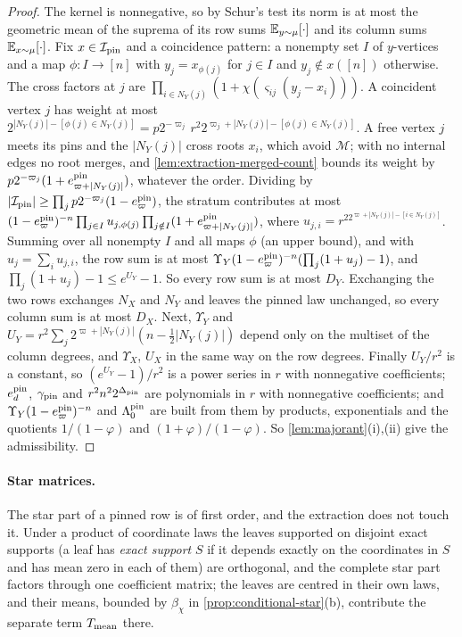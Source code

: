 \begin{proof}
The kernel is nonnegative, so by Schur's test its norm is at most the geometric mean
of the suprema of its row sums $\mathbb E_{y\sim\mu}[\cdot]$ and its column sums
$\mathbb E_{x\sim\mu}[\cdot]$. Fix $x\in\mathcal I_{\rm pin}$ and a coincidence pattern: a
nonempty set $I$ of $y$-vertices and a map $\phi\colon I\to[n]$ with $y_j=x_{\phi(j)}$
for $j\in I$ and $y_j\notin x([n])$ otherwise. The cross factors at $j$ are
$\prod_{i\in N_Y(j)}(1+\chi(\varsigma_{ij}(y_j-x_i)))$. A coincident vertex $j$ has
weight at most $2^{|N_Y(j)|-[\phi(j)\in N_Y(j)]}=p2^{-\varpi_j}\,r^2
2^{\varpi_j+|N_Y(j)|-[\phi(j)\in N_Y(j)]}$. A free vertex $j$ meets its pins and the
$|N_Y(j)|$ cross roots $x_i$, which avoid $\mathcal M$; with no internal edges no root
merges, and \cref{lem:extraction-merged-count} bounds its weight by
$p2^{-\varpi_j}(1+e^{\rm pin}_{\varpi+|N_Y(j)|})$, whatever the order. Dividing by
$|\mathcal I_{\rm pin}|\ge\prod_jp2^{-\varpi_j}(1-e^{\rm pin}_\varpi)$, the stratum
contributes at most
$(1-e^{\rm pin}_\varpi)^{-n}\prod_{j\in I}u_{j,\phi(j)}\prod_{j\notin I}
(1+e^{\rm pin}_{\varpi+|N_Y(j)|})$, where $u_{j,i}=r^22^{\varpi+|N_Y(j)|-[i\in N_Y(j)]}$.
Summing over all nonempty $I$ and all maps $\phi$ (an upper bound), and with
$u_j=\sum_iu_{j,i}$, the row sum is at most
$\Upsilon_Y(1-e^{\rm pin}_\varpi)^{-n}(\prod_j(1+u_j)-1)$, and
$\prod_j(1+u_j)-1\le e^{U_Y}-1$. So every row sum is at most $D_Y$.
Exchanging the two rows exchanges $N_X$ and $N_Y$ and leaves the pinned law
unchanged, so every column sum is at most $D_X$. Next, $\Upsilon_Y$ and
$U_Y=r^2\sum_j2^{\varpi+|N_Y(j)|}(n-\frac12|N_Y(j)|)$ depend only on the multiset of
the column degrees, and $\Upsilon_X$, $U_X$ in the same way on the row degrees.
Finally $U_Y/r^2$ is a constant, so $(e^{U_Y}-1)/r^2$ is a power series in $r$ with
nonnegative coefficients; $e^{\rm pin}_d$, $\gamma_{\rm pin}$ and
$r^2n^22^{\Delta_{\rm pin}}$ are polynomials in $r$ with nonnegative coefficients; and
$\Upsilon_Y(1-e^{\rm pin}_\varpi)^{-n}$ and $\Lambda^{\rm pin}_0$ are built from them
by products, exponentials and the quotients $1/(1-\varphi)$ and
$(1+\varphi)/(1-\varphi)$. So \cref{lem:majorant}(i),(ii) give the admissibility.
\end{proof}

\paragraph{Star matrices.}
The star part of a pinned row is of first order, and the extraction does not touch
it. Under a product of coordinate laws the leaves supported on
disjoint exact supports (a leaf has \emph{exact support} $S$ if
it depends exactly on the coordinates in $S$ and has mean zero in
each of them) are orthogonal, and the complete star part factors
through one coefficient matrix; the
leaves are centred in their own laws, and their means, bounded by
$\beta_\chi$ in \cref{prop:conditional-star}(b), contribute the separate term
$T_{\rm mean}$ there.

